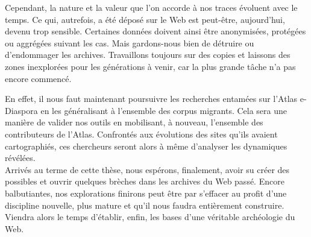 \documentclass[symmetric,justified,marginals=raggedouter]{tufte-book}
\begin{document}
Cependant, la nature et la valeur que l'on accorde à nos traces évoluent avec le temps. Ce qui, autrefois, a été déposé sur le Web est peut-être, aujourd'hui, devenu trop sensible. Certaines données doivent ainsi être anonymisées, protégées ou aggrégées suivant les cas. Mais gardons-nous bien de détruire ou d'endommager les archives. Travaillons toujours sur des copies et laissons des zones inexplorées pour les générations à venir, car la plus grande tâche n'a pas encore commencé.

En effet, il nous faut maintenant poursuivre les recherches entamées sur l'Atlas e-Diaspora en les généralisant à l'ensemble des corpus migrants. Cela sera une manière de valider nos outils en mobilisant, à nouveau, l'ensemble des contributeurs de l'Atlas. Confrontés aux évolutions des sites qu'ils avaient cartographiés, ces chercheurs seront alors à même d'analyser les dynamiques révélées.\\

\noindent Arrivés au terme de cette thèse, nous espérons, finalement, avoir su créer des possibles et ouvrir quelques brèches dans les archives du Web passé. Encore balbutiantes, nos explorations finirons peut être par s'effacer au profit d'une discipline nouvelle, plus mature et qu'il nous faudra entièrement construire. Viendra alors le temps d'établir, enfin, les bases d'une véritable archéologie du Web.   



\backmatter





\end{document}
